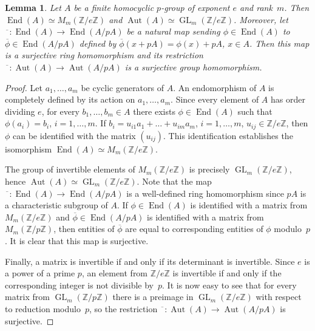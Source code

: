 \documentclass{article}
\newtheorem{lemma}[theorem]{Lemma}
\DeclareMathOperator{\Aut}{Aut}
\DeclareMathOperator{\End}{End}
\DeclareMathOperator{\GL}{GL}
\begin{document}
\begin{lemma}\label{homo}
	Let \( A \) be a finite homocyclic \( p \)-group of exponent \( e \) and rank~\( m \).
	Then \( \End(A) \simeq M_m(\mathbb{Z}/e\mathbb{Z}) \) and \( \Aut(A) \simeq \GL_m(\mathbb{Z}/e\mathbb{Z}) \).
	Moreover, let \( \overline{\phantom{a}} : \End(A) \to \End(A/pA) \) be a natural map sending \( \phi \in \End(A) \)
	to \( \overline{\phi} \in \End(A/pA) \) defined by \( \overline{\phi}(x+pA) = \phi(x) + pA \), \( x \in A \).
	Then this map is a surjective ring homomorphism and its restriction \( \overline{\phantom{a}} : \Aut(A) \to \Aut(A/pA) \) is
	a surjective group homomorphism.
\end{lemma}
\begin{proof}
	Let \( a_1, \dots, a_m \) be cyclic generators of \( A \). An endomorphism of \( A \) is completely defined by its
	action on \( a_1, \dots, a_m \). Since every element of \( A \) has order dividing \( e \), for every \( b_1, \dots, b_m \in A \)
	there exists \( \phi \in \End(A) \) such that \( \phi(a_i) = b_i \), \( i = 1, \dots, m \).
	If \( b_i = u_{i1}a_1 + \dots + u_{im}a_m \), \( i = 1, \dots, m \), \( u_{ij} \in \mathbb{Z}/e\mathbb{Z} \),
	then \( \phi \) can be identified with the matrix \( (u_{ij}) \).
	This identification establishes the isomorphism \( \End(A) \simeq M_m(\mathbb{Z}/e\mathbb{Z}) \).

	The group of invertible elements of \( M_m(\mathbb{Z}/e\mathbb{Z}) \) is precisely \( \GL_m(\mathbb{Z}/e\mathbb{Z}) \),
	hence \( \Aut(A) \simeq \GL_m(\mathbb{Z}/e\mathbb{Z}) \). Note that the map \( \overline{\phantom{a}} : \End(A) \to \End(A/pA) \)
	is a well-defined ring homomorphism since \( pA \) is a characteristic subgroup of \( A \).
	If \( \phi \in \End(A) \) is identified with a matrix from \( M_m(\mathbb{Z}/e\mathbb{Z}) \)
	and \( \overline{\phi} \in \End(A/pA) \) is identified with a matrix from \( M_m(\mathbb{Z}/p\mathbb{Z}) \),
	then entities of \( \overline{\phi} \) are equal to corresponding entities of \( \phi \) modulo~\( p \).
	It is clear that this map is surjective.

	Finally, a matrix is invertible if and only if its determinant is invertible.
	Since \( e \) is a power of a prime \( p \), an element from \( \mathbb{Z}/e\mathbb{Z} \)
	is invertible if and only if the corresponding integer is not divisible by~\( p \).
	It is now easy to see that for every matrix from \( \GL_m(\mathbb{Z}/p\mathbb{Z}) \)
	there is a preimage in \( \GL_m(\mathbb{Z}/e\mathbb{Z}) \) with respect to reduction modulo~\( p \),
	so the restriction \( \overline{\phantom{a}} : \Aut(A) \to \Aut(A/pA) \) is surjective.
\end{proof}
\end{document}
